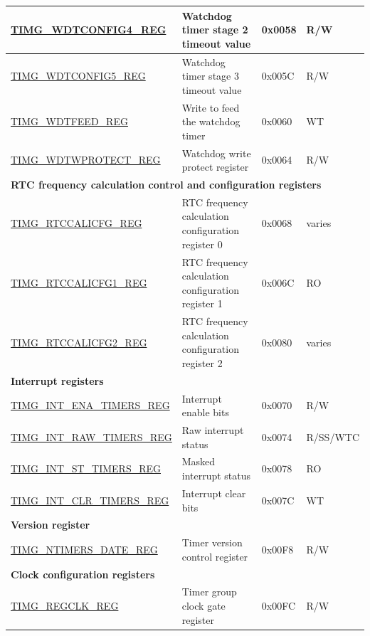 \begin{longtable}{ | p{6cm} | p{7.2cm} | p{1.3cm} | p{1.5cm} | }
\hyperref[regdesc:TIMGWDTCONFIG4REG]{TIMG\_WDTCONFIG4\_REG} & Watchdog timer stage 2 timeout value & 0x0058 & R/W \\ \hline
\hyperref[regdesc:TIMGWDTCONFIG5REG]{TIMG\_WDTCONFIG5\_REG} & Watchdog timer stage 3 timeout value & 0x005C & R/W \\ \hline
\hyperref[regdesc:TIMGWDTFEEDREG]{TIMG\_WDTFEED\_REG} & Write to feed the watchdog timer & 0x0060 & WT \\ \hline
\hyperref[regdesc:TIMGWDTWPROTECTREG]{TIMG\_WDTWPROTECT\_REG} & Watchdog write protect register & 0x0064 & R/W \\ \hline
\multicolumn{4}{|l|}{\textbf{RTC frequency calculation control and configuration registers}} \\ \hline
\hyperref[regdesc:TIMGRTCCALICFGREG]{TIMG\_RTCCALICFG\_REG} & RTC frequency calculation configuration register 0 & 0x0068 & varies \\ \hline
\hyperref[regdesc:TIMGRTCCALICFG1REG]{TIMG\_RTCCALICFG1\_REG} & RTC frequency calculation configuration register 1 & 0x006C & RO \\ \hline
\hyperref[regdesc:TIMGRTCCALICFG2REG]{TIMG\_RTCCALICFG2\_REG} & RTC frequency calculation configuration register 2 & 0x0080 & varies \\ \hline
\multicolumn{4}{|l|}{\textbf{Interrupt registers}} \\ \hline
\hyperref[regdesc:TIMGINTENATIMERSREG]{TIMG\_INT\_ENA\_TIMERS\_REG} & Interrupt enable bits & 0x0070 & R/W \\ \hline
\hyperref[regdesc:TIMGINTRAWTIMERSREG]{TIMG\_INT\_RAW\_TIMERS\_REG} & Raw interrupt status & 0x0074 & R/SS/WTC \\ \hline
\hyperref[regdesc:TIMGINTSTTIMERSREG]{TIMG\_INT\_ST\_TIMERS\_REG} & Masked interrupt status & 0x0078 & RO \\ \hline
\hyperref[regdesc:TIMGINTCLRTIMERSREG]{TIMG\_INT\_CLR\_TIMERS\_REG} & Interrupt clear bits & 0x007C & WT \\ \hline
\multicolumn{4}{|l|}{\textbf{Version register}} \\ \hline
\hyperref[regdesc:TIMGNTIMERSDATEREG]{TIMG\_NTIMERS\_DATE\_REG} & Timer version control register & 0x00F8 & R/W \\ \hline
\multicolumn{4}{|l|}{\textbf{Clock configuration registers}} \\ \hline
\hyperref[regdesc:TIMGREGCLKREG]{TIMG\_REGCLK\_REG} & Timer group clock gate register & 0x00FC & R/W \\ \hline
\end{longtable}
